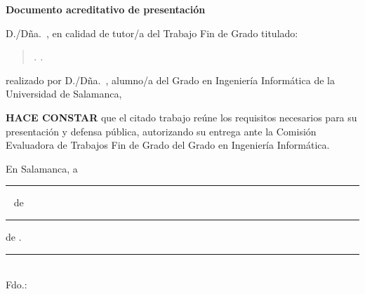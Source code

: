 \thispagestyle{empty}

\begin{center}
{\Large\bfseries Documento acreditativo de presentación}
\end{center}

\vspace{1cm}

\noindent D./Dña.~\TFGTutor, en calidad de tutor/a del Trabajo Fin de Grado
titulado:

\vspace{0.4cm}
\begin{quote}\itshape
\TFGTitulo. \TFGSubtitulo.
\end{quote}
\vspace{0.4cm}

\noindent realizado por D./Dña.~\TFGAutor, alumno/a del Grado en
Ingeniería Informática de la Universidad de Salamanca,

\vspace{0.4cm}

\noindent \textbf{HACE CONSTAR} que el citado trabajo reúne los
requisitos necesarios para su presentación y defensa pública,
autorizando su entrega ante la Comisión Evaluadora de Trabajos Fin de
Grado del Grado en Ingeniería Informática.

\vspace{2cm}

\noindent En Salamanca, a \rule{2cm}{0.4pt}~ de \rule{3.5cm}{0.4pt} de \TFGAnio.

\vspace{2cm}

\begin{flushright}
\rule{6cm}{0.4pt}\\
Fdo.: \TFGTutor
\end{flushright}

\clearpage
